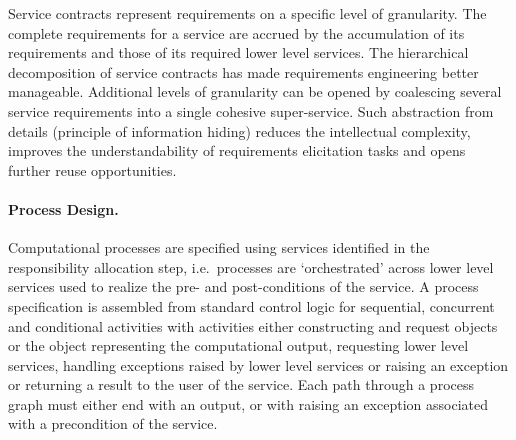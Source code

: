 Service contracts represent requirements on a specific level of granularity. The complete requirements for a service are accrued by the accumulation of its requirements and those of its required lower level services. The hierarchical decomposition of service contracts has made requirements engineering better manageable. Additional levels of granularity can be opened by coalescing several service requirements into a single cohesive super-service. Such abstraction from details (principle of information hiding) reduces the intellectual complexity, improves the understandability of requirements elicitation tasks and opens further reuse opportunities. 

\paragraph{Process Design.} Computational processes are specified using services identified in the responsibility allocation step, i.e.\ processes are `orchestrated' across lower level services used to realize the pre- and post-conditions of the service. A process specification is assembled from standard control logic for sequential, concurrent and conditional activities with activities either  constructing and request objects or the object representing the computational output, requesting lower level services, handling exceptions raised by lower level services or raising an exception or returning a result to the user of the service. Each path through a process graph must either end with an output, or with raising an exception associated with a precondition of the service.

